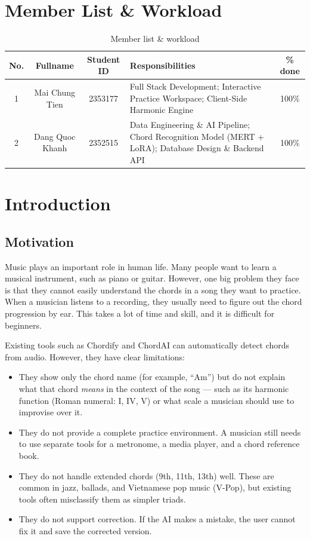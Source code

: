 \documentclass[a4paper]{article}
\begin{document}
\section*{Member List \& Workload}
\begin{table}[h]
\centering
\renewcommand{\arraystretch}{1.5}
\begin{tabularx}{\linewidth}{|c|c|c|X|c|}
\hline
\textbf{No.} & \textbf{Fullname} & \textbf{Student ID} & \textbf{Responsibilities} & \textbf{\% done}\\
\hline
1 & Mai Chung Tien & 2353177 &
  Full Stack Development; Interactive Practice Workspace; Client-Side Harmonic Engine
  & 100\%\\
\hline
2 & Dang Quoc Khanh & 2352515 &
  Data Engineering \& AI Pipeline; Chord Recognition Model (MERT + LoRA); Database Design \& Backend API
  & 100\%\\
\hline
\end{tabularx}
\caption{\label{table1}Member list \& workload}
\end{table}
\pagebreak
\setlength{\parindent}{0pt}

\section{Introduction}

\subsection{Motivation}

Music plays an important role in human life. Many people want to learn a musical instrument, such as piano or guitar. However, one big problem they face is that they cannot easily understand the chords in a song they want to practice. When a musician listens to a recording, they usually need to figure out the chord progression by ear. This takes a lot of time and skill, and it is difficult for beginners.

Existing tools such as Chordify and ChordAI can automatically detect chords from audio. However, they have clear limitations:
\begin{itemize}
    \item They show only the chord name (for example, ``Am'') but do not explain what that chord \emph{means} in the context of the song --- such as its harmonic function (Roman numeral: I, IV, V) or what scale a musician should use to improvise over it.
    \item They do not provide a complete practice environment. A musician still needs to use separate tools for a metronome, a media player, and a chord reference book.
    \item They do not handle extended chords (9th, 11th, 13th) well. These are common in jazz, ballads, and Vietnamese pop music (V-Pop), but existing tools often misclassify them as simpler triads.
    \item They do not support correction. If the AI makes a mistake, the user cannot fix it and save the corrected version.
\end{itemize}
\end{document}
